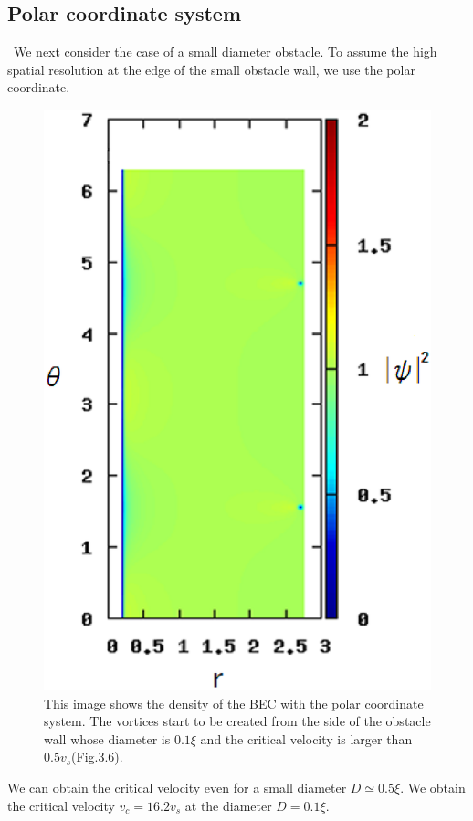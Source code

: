 \documentclass[12pt,a4paper]{report} %
\begin{document}
\subsection{Polar coordinate system}
\ We next consider the case of a small diameter obstacle.
To assume the high spatial resolution at the edge of the small obstacle wall,
we use the polar coordinate.
\begin{figure}[htbp]\begin{center}%
\includegraphics[scale=0.7,keepaspectratio]{3-6.eps}
\caption{
This image shows the density of the BEC with the polar coordinate system.
The vortices start to be created from the side of the obstacle wall whose diameter is $0.1 \xi$
and the critical velocity is larger than $0.5v_s$(Fig.3.6).
}
\label{FIG:3-6}
\end{center}\end{figure}
We can obtain the critical velocity even for a small diameter $D \simeq 0.5 \xi$.
We obtain the critical velocity $v_c = 16.2 v_s$ at the diameter $D = 0.1 \xi$.
\end{document}
